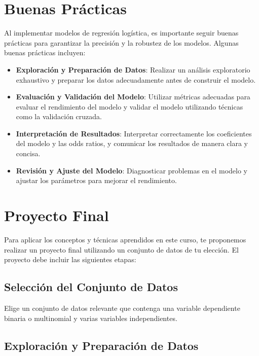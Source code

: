 \documentclass[a4paper]{report} %
\begin{document}
\section{Buenas Pr\'acticas}

Al implementar modelos de regresi\'on log\'istica, es importante seguir buenas pr\'acticas para garantizar la precisi\'on y la robustez de los modelos. Algunas buenas pr\'acticas incluyen:

\begin{itemize}
    \item \textbf{Exploraci\'on y Preparaci\'on de Datos}: Realizar un an\'alisis exploratorio exhaustivo y preparar los datos adecuadamente antes de construir el modelo.
    \item \textbf{Evaluaci\'on y Validaci\'on del Modelo}: Utilizar m\'etricas adecuadas para evaluar el rendimiento del modelo y validar el modelo utilizando t\'ecnicas como la validaci\'on cruzada.
    \item \textbf{Interpretaci\'on de Resultados}: Interpretar correctamente los coeficientes del modelo y las odds ratios, y comunicar los resultados de manera clara y concisa.
    \item \textbf{Revisi\'on y Ajuste del Modelo}: Diagnosticar problemas en el modelo y ajustar los par\'ametros para mejorar el rendimiento.
\end{itemize}

\section{Proyecto Final}

Para aplicar los conceptos y t\'ecnicas aprendidos en este curso, te proponemos realizar un proyecto final utilizando un conjunto de datos de tu elecci\'on. El proyecto debe incluir las siguientes etapas:

\subsection{Selecci\'on del Conjunto de Datos}

Elige un conjunto de datos relevante que contenga una variable dependiente binaria o multinomial y varias variables independientes.

\subsection{Exploraci\'on y Preparaci\'on de Datos}
\end{document}
